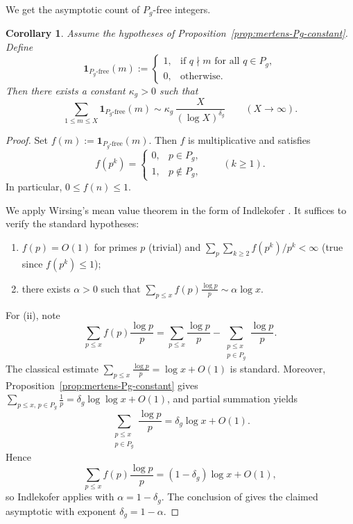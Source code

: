 \documentclass[11pt,letterpaper]{amsart}
\theoremstyle{plain}
\newtheorem{corollary}[theorem]{Corollary}
\theoremstyle{definition}
\theoremstyle{remark}
\theoremstyle{plain}
\begin{document}
We get the asymptotic count of $P_g$-free integers.
\begin{corollary}
\label{cor:Pg-free-asymptotic-wirsing}
Assume the hypotheses of Proposition~\ref{prop:mertens-Pg-constant}. Define
\[
\mathbf{1}_{P_g\text{-free}}(m):=
\begin{cases}
1,&\text{if $q\nmid m$ for all $q\in P_g$},\\
0,&\text{otherwise.}
\end{cases}
\]
Then there exists a constant $\kappa_g>0$ such that
\[
\sum_{1\le m\le X}\mathbf{1}_{P_g\text{-free}}(m)
\sim
\kappa_g\,\frac{X}{(\log X)^{\delta_g}}
\qquad (X\to\infty).
\]
\end{corollary}

\begin{proof}
Set $f(m):=\mathbf{1}_{P_g\text{-free}}(m)$. Then $f$ is multiplicative and satisfies
\[
f(p^k)=
\begin{cases}
0,&p\in P_g,\\
1,&p\notin P_g,
\end{cases}
\qquad(k\ge 1).
\]
In particular, $0\le f(n)\le 1$.

We apply Wirsing’s mean value theorem in the form of Indlekofer \cite[Theorem~(Satz)~1.1]{Ind80}.
It suffices to verify the standard hypotheses:
\begin{enumerate}[label=\textup{(\roman*)},leftmargin=*]
\item $f(p)=O(1)$ for primes $p$ (trivial) and $\sum_{p}\sum_{k\ge 2} f(p^k)/p^k<\infty$ (true since $f(p^k)\le 1$);
\item there exists $\alpha>0$ such that $\sum_{p\le x} f(p)\frac{\log p}{p}\sim \alpha\log x$.
\end{enumerate}
For (ii), note
\[
\sum_{p\le x} f(p)\frac{\log p}{p}
=
\sum_{p\le x}\frac{\log p}{p}
-\sum_{\substack{p\le x\\ p\in P_g}}\frac{\log p}{p}.
\]
The classical estimate $\sum_{p\le x}\frac{\log p}{p}=\log x+O(1)$ is standard.
Moreover, Proposition~\ref{prop:mertens-Pg-constant} gives
$\sum_{p\le x,\,p\in P_g}\frac1p=\delta_g\log\log x+O(1)$, and partial summation yields
\[
\sum_{\substack{p\le x\\ p\in P_g}}\frac{\log p}{p}
=
\delta_g\log x+O(1).
\]
Hence
\[
\sum_{p\le x} f(p)\frac{\log p}{p}
=
(1-\delta_g)\log x+O(1),
\]
so Indlekofer applies with $\alpha=1-\delta_g$.
The conclusion of \cite[Theorem~(Satz)~1.1]{Ind80} gives the claimed asymptotic with exponent $\delta_g=1-\alpha$.
\end{proof}
\end{document}
